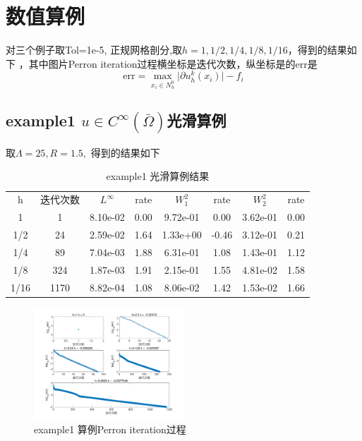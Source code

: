 \documentclass[11pt]{article}
\begin{document}
\section{数值算例}

对三个例子取Tol=1e-5, 正规网格剖分,取$h =1, 1/2,1/4,1/8,1/16$，得到的结果如下
，其中图片Perron iteration过程横坐标是迭代次数，纵坐标是的err是
$$\text{err}= \max_{x_i\in N_h^0}\vert{\partial u^k_h(x_i)}\vert-f_i$$

\subsection{example1 $u\in C^\infty{}(\bar{\Omega})$光滑算例}
取$\Lambda=25,R = 1.5,$ 得到的结果如下
\begin{table}[ht!]
\centering
\caption{example1 光滑算例结果}
\label{table}
    \begin{tabular}{  c| c|c c|c c| c c }
          \hline      
  \hline
  
\hline



    \hline     
  
  
\hline



    \hline     
    \hline   
    
 h  &迭代次数  	&$L^\infty{}$& rate&$W_1^2$&rate&$W_2^2$&rate\\

1&1&8.10e-02	&0.00	&9.72e-01	&0.00	&3.62e-01	&0.00\\
1/2&24&2.59e-02	&1.64	&1.33e+00	&-0.46	&3.12e-01	&0.21\\
1/4&89&7.04e-03	&1.88	&6.31e-01	&1.08	&1.43e-01	&1.12\\
1/8&324&1.87e-03	&1.91	&2.15e-01	&1.55	&4.81e-02	&1.58\\
1/16&1170&8.82e-04	&1.08	&8.06e-02	&1.42	&1.53e-02	&1.66\\
      \hline      
  \hline
  
\hline



    \hline     
    \hline
 
  \hline
  
\hline


    \end{tabular}
\end{table}




\begin{figure}[htp!]
\centering
\caption{example1 算例Perron iteration过程}
\includegraphics[width=0.5\textwidth]{1.png}
\end{figure}
\end{document}
